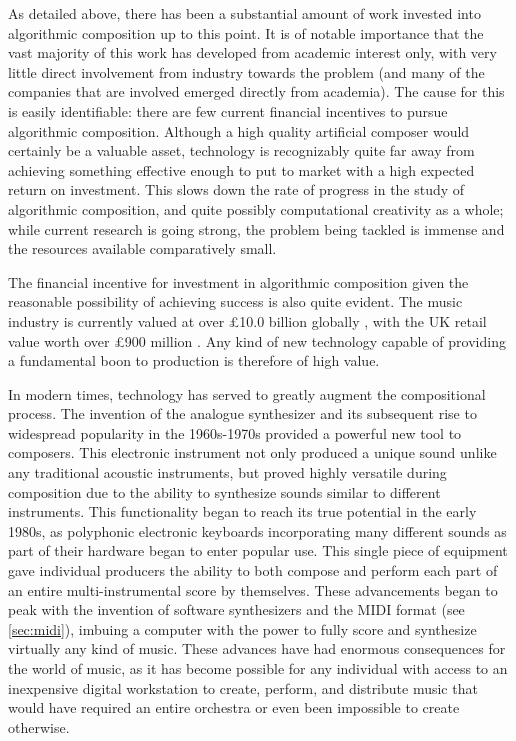 \documentclass[ author={Stephen Livermore-Tozer},
				supervisor={Dr. Peter Flach},
				degree={MEng},
				title={Performing Algorithmic Co-composition Using Machine Learning},
				subtitle={},
				type={research},
				year={2016} ]{dissertation}
\begin{document}
	As detailed above, there has been a substantial amount of work invested into algorithmic composition up to this point. It is of notable importance that the vast majority of this work has developed from academic interest only, with very little direct involvement from industry towards the problem (and many of the companies that are involved emerged directly from academia). The cause for this is easily identifiable: there are few current financial incentives to pursue algorithmic composition. Although a high quality artificial composer would certainly be a valuable asset, technology is recognizably quite far away from achieving something effective enough to put to market with a high expected return on investment. This slows down the rate of progress in the study of algorithmic composition, and quite possibly computational creativity as a whole; while current research is going strong, the problem being tackled is immense and the resources available comparatively small. 
	
	The financial incentive for investment in algorithmic composition given the reasonable possibility of achieving success is also quite evident. The music industry is currently valued at over \pounds 10.0 billion globally \cite{smirke2015global}, with the UK retail value worth over \pounds 900 million \cite{riaj2015global}. Any kind of new technology capable of providing a fundamental boon to production is therefore of high value. 
	
	
	In modern times, technology has served to greatly augment the compositional process. The invention of the 
	analogue synthesizer and its subsequent rise to widespread popularity in the 1960s-1970s provided a powerful new tool to composers. This electronic instrument not only produced a unique sound unlike any traditional acoustic instruments, but proved highly versatile during composition due to the ability to synthesize sounds similar to different instruments. This functionality began to reach its true potential in the early 1980s, as polyphonic electronic keyboards incorporating many different sounds as part of their hardware began to enter popular use. This single piece of equipment gave individual producers the ability to both compose and perform each part of an entire multi-instrumental score by themselves. These advancements began to peak with the invention of software synthesizers and the MIDI format (see \ref{sec:midi}), imbuing a computer with the power to fully score and synthesize virtually any kind of music. These advances have had enormous consequences for the world of music, as it has become possible for any individual with access to an inexpensive digital workstation to create, perform, and distribute music that would have required an entire orchestra or even been impossible to create otherwise.
	
\end{document}
